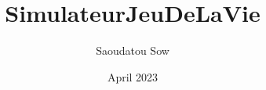 \documentclass{report}
\title{SimulateurJeuDeLaVie}
\author{Saoudatou Sow}
\date{April 2023}
\begin{document}
\renewcommand{\contentsname}{Table des matières}
\renewcommand{\bibname}{Bibliographie}
\renewcommand{\thesection}{\arabic{section}}

\newpage
\tableofcontents%
\newpage








\nocite{mind}
\nocite{Golly}
\nocite{Mathmatique}
\nocite{WIKIPEDIA}
\nocite{WIKIP}

 
\end{document}
